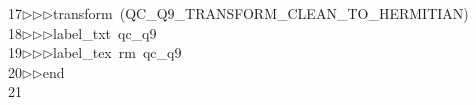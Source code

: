 \begin{tabbing}
17\>$\triangleright$\>$\triangleright$\>$\triangleright$\>transform\ (QC\_Q9\_TRANSFORM\_CLEAN\_TO\_HERMITIAN)\ \\[0pt]
18\>$\triangleright$\>$\triangleright$\>$\triangleright$\>label\_txt\ qc\_q9\ \\[0pt]
19\>$\triangleright$\>$\triangleright$\>$\triangleright$\>label\_tex\ rm\ qc\_q9\ \\[0pt]
20\>$\triangleright$\>$\triangleright$\>end\\[0pt]
21\>\end{tabbing}
